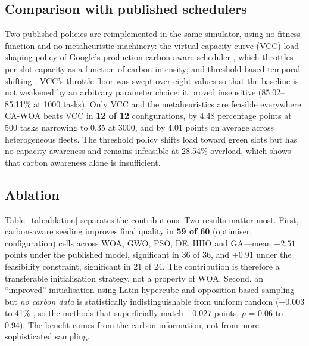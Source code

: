 \documentclass[12pt,a4paper]{article}
\providecommand{\DIFaddtex}[1]{{\protect\color{blue} \sf #1}} %
\providecommand{\DIFdeltex}[1]{{\protect\color{red} \scriptsize #1}} %
\providecommand{\DIFaddbegin}{} %
\providecommand{\DIFaddend}{} %
\providecommand{\DIFdelbegin}{} %
\providecommand{\DIFdelend}{} %
\providecommand{\DIFadd}[1]{\texorpdfstring{\DIFaddtex{#1}}{#1}} %
\providecommand{\DIFdel}[1]{\texorpdfstring{\DIFdeltex{#1}}{}} %
\providecommand{\DIFscaledelfig}{0.5}
\newlength{\DIFdelgraphicswidth} %
\newlength{\DIFdelgraphicsheight} %
\providecommand{\DIFaddincludegraphics}[2][]{{\color{blue}\fbox{\DIFOincludegraphics[#1]{#2}}}} %
\providecommand{\DIFdelincludegraphics}[2][]{%
\sbox{\DIFdelgraphicsbox}{\DIFOincludegraphics[#1]{#2}}%
\settoboxwidth{\DIFdelgraphicswidth}{\DIFdelgraphicsbox} %
\settoboxtotalheight{\DIFdelgraphicsheight}{\DIFdelgraphicsbox} %
\scalebox{\DIFscaledelfig}{%
\parbox[b]{\DIFdelgraphicswidth}{\usebox{\DIFdelgraphicsbox}\\[-\baselineskip] \rule{\DIFdelgraphicswidth}{0em}}\llap{\resizebox{\DIFdelgraphicswidth}{\DIFdelgraphicsheight}{%
\setlength{\unitlength}{\DIFdelgraphicswidth}%
\begin{picture}(1,1)%
\thicklines\linethickness{2pt} %
{\color[rgb]{1,0,0}\put(0,0){\framebox(1,1){}}}%
{\color[rgb]{1,0,0}\put(0,0){\line( 1,1){1}}}%
{\color[rgb]{1,0,0}\put(0,1){\line(1,-1){1}}}%
\end{picture}%
}\hspace*{3pt}}} %
} %
\DeclareRobustCommand{\DIFaddbegin}{\DIFOaddbegin \let\includegraphics\DIFaddincludegraphics} %
\DeclareRobustCommand{\DIFaddend}{\DIFOaddend \let\includegraphics\DIFOincludegraphics} %
\DeclareRobustCommand{\DIFdelbegin}{\DIFOdelbegin \let\includegraphics\DIFdelincludegraphics} %
\DeclareRobustCommand{\DIFdelend}{\DIFOaddend \let\includegraphics\DIFOincludegraphics} %
\begin{document}
\subsection{\DIFadd{Comparison with published schedulers}}\label{sec:modern}
\DIFadd{Two published policies are reimplemented in the same simulator, using no fitness function and no
metaheuristic machinery: the virtual-capacity-curve (VCC) load-shaping policy of Google's production
carbon-aware scheduler \cite{radovanovic2023carbon}, which throttles per-slot capacity as a function of carbon
intensity; and threshold-based temporal shifting \cite{wiesner2021lets}. VCC's throttle floor was swept over
eight values so that the baseline is not weakened by an arbitrary parameter choice; it proved insensitive
(85.02--85.11\% at 1000 tasks). Only VCC and the metaheuristics are feasible everywhere. CA-WOA beats VCC in
\textbf{12 of 12} configurations, by 4.48 percentage points at 500 tasks narrowing to 0.35 at 3000, and by
4.01 points on average across heterogeneous fleets. The threshold policy shifts load toward green slots but
has no capacity awareness and remains infeasible at 28.54\% overload, which shows that carbon awareness alone
is insufficient.
}

\subsection{\DIFadd{Ablation}}\label{sec:ablation}
\DIFadd{Table~\ref{tab:ablation} separates the contributions. Two results matter most. First, carbon-aware seeding
improves final quality in \textbf{59 of 60} (optimiser, configuration) cells across WOA, GWO, PSO, DE, HHO and
GA---mean $+2.51$ points under the published model, significant in 36 of 36, and $+0.91$ under the feasibility
constraint, significant in 21 of 24. The contribution is therefore a transferable initialisation strategy, not
a property of WOA. Second, an ``improved'' initialisation using Latin-hypercube and opposition-based sampling
but \emph{no carbon data} is statistically indistinguishable from uniform random ($+0.003$ }\DIFaddend to \DIFdelbegin \DIFdel{41\% , so the methods that superficially match }\DIFdelend \DIFaddbegin \DIFadd{$+0.027$ points,
$p$ = 0.06 to 0.94). The benefit comes from the carbon information, not from more sophisticated sampling.
}
\end{document}
